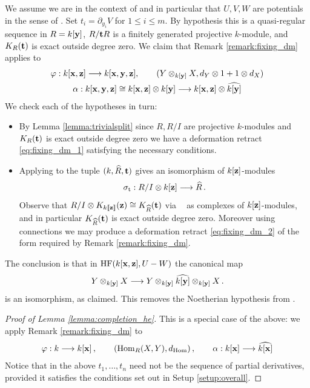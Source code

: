 \documentclass[english,letter paper,12pt,leqno]{article}
\theoremstyle{example}
\numberwithin{equation}{section}
\def\Hom{\operatorname{Hom}}
\DeclareMathOperator{\HF}{HF}
\DeclareMathOperator{\sigmastar}{\sigma_t}
\begin{document}
We assume we are in the context of \cite[Setup 4.1]{cut} and in particular that $U,V,W$ are potentials in the sense of \cite[Definition 2.4]{lgdual}. Set $t_i = \partial_{y_i} V$ for $1 \le i \le m$. By hypothesis this is a quasi-regular sequence in $R = k[\bold{y}]$, $R/\bold{t} R$ is a finitely generated projective $k$-module, and $K_R(\bold{t})$ is exact outside degree zero. We claim that Remark \ref{remark:fixing_dm} applies to
\begin{gather*}
\varphi: k[\bold{x},\bold{z}] \longrightarrow k[\bold{x},\bold{y},\bold{z}], \qquad ( Y \otimes_{k[\bold{y}]} X, d_Y \otimes 1 + 1 \otimes d_X)\\
\alpha: k[\bold{x},\bold{y},\bold{z}] \cong k[\bold{x},\bold{z}] \otimes k[\bold{y}] \longrightarrow k[\bold{x},\bold{z}] \otimes \widehat{k[\bold{y}]}
\end{gather*}
We check each of the hypotheses in turn:
\begin{itemize}
\item By Lemma \ref{lemma:trivialsplit} since $R,R/I$ are projective $k$-modules and $K_R(\bold{t})$ is exact outside degree zero we have a deformation retract \eqref{eq:fixing_dm_1} satisfying the necessary conditions.

\item Applying \cite[Appendix B]{pushforward} to the tuple $(k, \widehat{R}, \bold{t})$ gives an isomorphism of $k[\bold{z}]$-modules
\[
\sigmastar: R/I \otimes k[\bold{z}] \lto \widehat{R}\,.
\]
Observe that $R/I \otimes K_{k\llbracket \bold{z} \rrbracket}(\bold{z}) \cong K_{\widehat{R}}(\bold{t})$ via $\sigmastar$ as complexes of $k[\bold{z}]$-modules, and in particular $K_{\widehat{R}}(\bold{t})$ is exact outside degree zero. Moreover using connections we may produce a deformation retract \eqref{eq:fixing_dm_2} of the form required by Remark \ref{remark:fixing_dm}.
\end{itemize}
The conclusion is that in $\HF( k[\bold{x},\bold{z}], U - W)$ the canonical map
\[
Y \otimes_{k[\bold{y}]} X \longrightarrow Y \otimes_{k[\bold{y}]} \widehat{k[\bold{y}]} \otimes_{k[\bold{y}]} X\,.
\]
is an isomorphism, as claimed. This removes the Noetherian hypothesis from \cite{cut}.

\begin{proof}[Proof of Lemma \ref{lemma:completion_he}] This is a special case of the above: we apply Remark \ref{remark:fixing_dm} to
\begin{gather*}
\varphi: k \lto k[\bold{x}]\,, \qquad ( \Hom_R(X,Y), d_{\Hom} )\,, \qquad \alpha: k[\bold{x}] \lto \widehat{k[\bold{x}]}
\end{gather*}
Notice that in the above $t_1,\ldots,t_n$ need not be the sequence of partial derivatives, provided it satisfies the conditions set out in Setup \ref{setup:overall}.
\end{proof}
\end{document}
